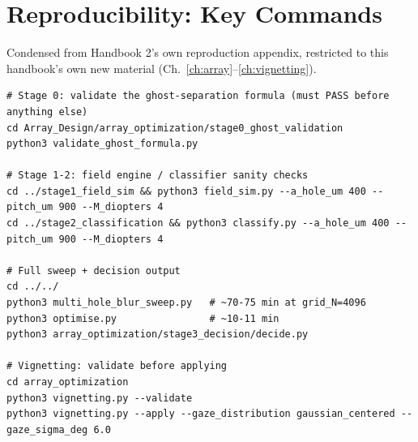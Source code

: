\documentclass[11pt]{report}
\begin{document}
\chapter{Reproducibility: Key Commands}
Condensed from Handbook 2's own reproduction appendix, restricted to this handbook's own new
material (Ch.~\ref{ch:array}--\ref{ch:vignetting}).
\begin{verbatim}
# Stage 0: validate the ghost-separation formula (must PASS before anything else)
cd Array_Design/array_optimization/stage0_ghost_validation
python3 validate_ghost_formula.py

# Stage 1-2: field engine / classifier sanity checks
cd ../stage1_field_sim && python3 field_sim.py --a_hole_um 400 --pitch_um 900 --M_diopters 4
cd ../stage2_classification && python3 classify.py --a_hole_um 400 --pitch_um 900 --M_diopters 4

# Full sweep + decision output
cd ../../
python3 multi_hole_blur_sweep.py   # ~70-75 min at grid_N=4096
python3 optimise.py                # ~10-11 min
python3 array_optimization/stage3_decision/decide.py

# Vignetting: validate before applying
cd array_optimization
python3 vignetting.py --validate
python3 vignetting.py --apply --gaze_distribution gaussian_centered --gaze_sigma_deg 6.0
\end{verbatim}
\end{document}
